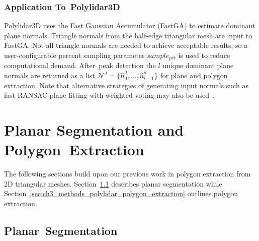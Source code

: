 

\subsubsection{Application To~Polylidar3D} %

Polylidar3D uses the Fast Gaussian Accumulator (FastGA) to estimate dominant plane normals. Triangle normals from the half-edge triangular mesh are input to FastGA. Not all triangle normals are needed to achieve acceptable results, so a user-configurable percent sampling parameter $sample_{pct}$ is used to reduce computational demand. After~peak detection the $l$ unique dominant plane normals are returned as a list  $\mathcal{N}^d = \{\hat{n}^d_0, \ldots, \hat{n}^d_{l-1} \}$ for plane and polygon extraction. Note that alternative strategies of generating input normals such as fast RANSAC plane fitting with weighted voting may also be used~\cite{limberger_real-time_2015}.

\section{Planar Segmentation and Polygon~Extraction}\label{sec:ch3_methods_polylidar}

The following sections build upon our previous work in polygon extraction from 2D triangular meshes. Section~\ref{sec:ch3_methods_polylidar_plane_extraction} describes planar segmentation while Section~\ref{sec:ch3_methods_polylidar_polygon_extraction} outlines polygon extraction. 


\subsection{Planar~Segmentation}\label{sec:ch3_methods_polylidar_plane_extraction}

